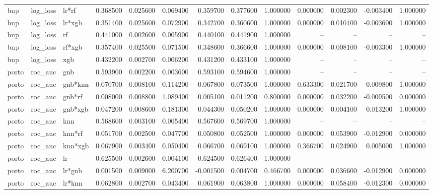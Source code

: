 \begin{landscape}
\begin{longtable}{lllrrrrrrrrrr}
bnp & log\_loss & lr*rf & 0.368500 & 0.025600 & 0.069400 & 0.359700 & 0.377600 & 1.000000 & 0.000000 & 0.002300 & -0.003400 & 1.000000 \\
bnp & log\_loss & lr*xgb & 0.351400 & 0.025600 & 0.072900 & 0.342700 & 0.360600 & 1.000000 & 0.000000 & 0.010400 & -0.003600 & 1.000000 \\
bnp & log\_loss & rf & 0.441000 & 0.002600 & 0.005900 & 0.440100 & 0.441900 & 1.000000 & -- & -- & -- & -- \\
bnp & log\_loss & rf*xgb & 0.357400 & 0.025500 & 0.071500 & 0.348600 & 0.366600 & 1.000000 & 0.000000 & 0.008100 & -0.003300 & 1.000000 \\
bnp & log\_loss & xgb & 0.432200 & 0.002700 & 0.006200 & 0.431200 & 0.433100 & 1.000000 & -- & -- & -- & -- \\
porto & roc\_auc & gnb & 0.593900 & 0.002200 & 0.003600 & 0.593100 & 0.594600 & 1.000000 & -- & -- & -- & -- \\
porto & roc\_auc & gnb*knn & 0.070700 & 0.008100 & 0.114200 & 0.067800 & 0.073500 & 1.000000 & 0.633300 & 0.021700 & 0.009800 & 1.000000 \\
porto & roc\_auc & gnb*rf & 0.008000 & 0.008800 & 1.089400 & 0.005100 & 0.011200 & 0.800000 & 0.000000 & 0.032200 & -0.009500 & 0.000000 \\
porto & roc\_auc & gnb*xgb & 0.047200 & 0.008600 & 0.181300 & 0.044300 & 0.050200 & 1.000000 & 0.000000 & 0.004100 & 0.013200 & 1.000000 \\
porto & roc\_auc & knn & 0.568600 & 0.003100 & 0.005400 & 0.567600 & 0.569700 & 1.000000 & -- & -- & -- & -- \\
porto & roc\_auc & knn*rf & 0.051700 & 0.002500 & 0.047700 & 0.050800 & 0.052500 & 1.000000 & 0.000000 & 0.053900 & -0.012900 & 0.000000 \\
porto & roc\_auc & knn*xgb & 0.067900 & 0.003400 & 0.050400 & 0.066700 & 0.069100 & 1.000000 & 0.366700 & 0.024900 & 0.005000 & 1.000000 \\
porto & roc\_auc & lr & 0.625500 & 0.002600 & 0.004100 & 0.624500 & 0.626400 & 1.000000 & -- & -- & -- & -- \\
porto & roc\_auc & lr*gnb & 0.001500 & 0.009000 & 6.200700 & -0.001500 & 0.004700 & 0.466700 & 0.000000 & 0.036600 & -0.012900 & 0.000000 \\
porto & roc\_auc & lr*knn & 0.062800 & 0.002700 & 0.043400 & 0.061900 & 0.063800 & 1.000000 & 0.000000 & 0.058400 & -0.012300 & 0.000000 \\
\end{longtable}\endgroup

\end{landscape}
